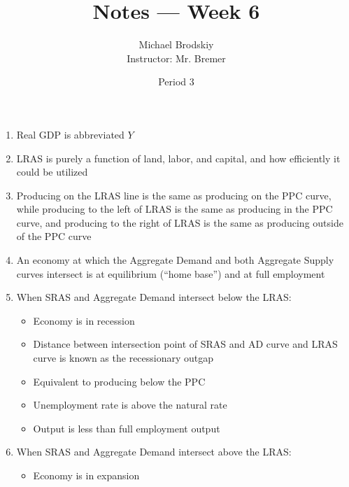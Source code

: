 \documentclass[12pt]{article}
\title{Notes — Week 6}
\date{Period 3}
\author{Michael Brodskiy\\ \small Instructor: Mr. Bremer}
\begin{document}
\maketitle

\begin{enumerate}

  \item Real GDP is abbreviated $Y$

  \item LRAS is purely a function of land, labor, and capital, and how efficiently it could be utilized
    
  \item Producing on the LRAS line is the same as producing on the PPC curve, while producing to the left of LRAS is the same as producing in the PPC curve, and producing to the right of LRAS is the same as producing outside of the PPC curve

  \item An economy at which the Aggregate Demand and both Aggregate Supply curves intersect is at equilibrium (“home base”) and at full employment

  \item When SRAS and Aggregate Demand intersect below the LRAS:

    \begin{itemize}

      \item Economy is in recession

      \item Distance between intersection point of SRAS and AD curve and LRAS curve is known as the recessionary outgap

      \item Equivalent to producing below the PPC

      \item Unemployment rate is above the natural rate

      \item Output is less than full employment output

    \end{itemize}

  \item When SRAS and Aggregate Demand intersect above the LRAS:

    \begin{itemize}

      \item Economy is in expansion


\end{itemize}
\end{enumerate}
\end{document}
